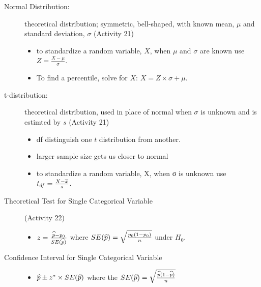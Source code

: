 \begin{description}
\item [Normal Distribution:] theoretical distribution; symmetric,
  bell-shaped,  with  known mean, $\mu$ and standard deviation,
  $\sigma$ (Activity 21)  
  \begin{itemize}
  \item to standardize a random variable, $X$, when $\mu$ and $\sigma$
    are known use $Z = \frac{X-\mu}{\sigma}$.
  \item To find a percentile, solve for $X$:  $ X = Z\times\sigma +
    \mu$.
  \end{itemize}

\item [t-distribution:] theoretical distribution, used in place of
  normal when $\sigma$ is unknown and is estimted by $s$ (Activity 21)
  \begin{itemize}
  \item df distinguish one $t$ distribution from another.
  \item larger sample size gets us closer to normal
  \item to standardize a random variable, X, when  σ is unknown use $t_{df}
    = \frac{X-\overline{x}}{s}$. 
  \end{itemize}
\item [Theoretical Test for Single Categorical Variable] (Activity 22)
  \begin{itemize}
  \item $z = \frac{\widehat{p} - p_0}{SE(\widehat{p})}$ where $SE(\widehat{p}) =
    \sqrt{\frac{p_0(1-p_0)}{n}}$ under $H_0$.
  \end{itemize}
\item [Confidence Interval for Single Categorical Variable]
  \begin{itemize}
  \item $\widehat{p} \pm z^*\times{SE(\widehat{p})}$ where the $SE(\widehat{p}) =
    \sqrt{\frac{\widehat{p}(1-\widehat{p})}{n}}$ 
  \end{itemize}


\end{description}
